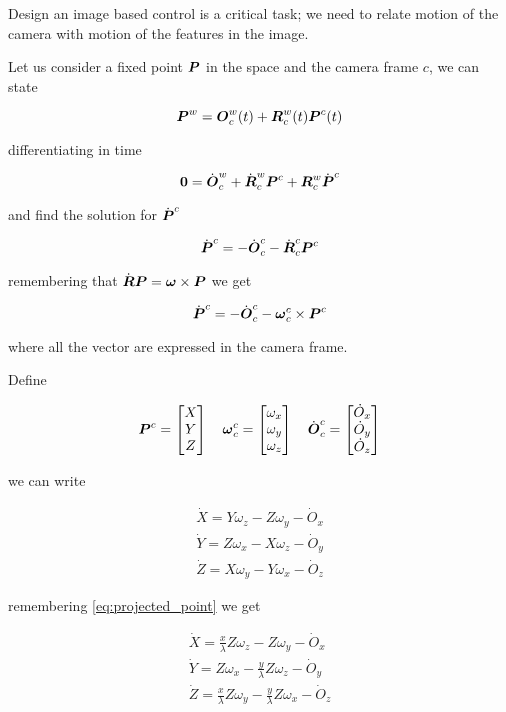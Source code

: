 Design an image based control is a critical task;
we need to relate motion of the camera with motion of the features in the image.

Let us consider a fixed point $\boldsymbol{P}$ in the space and the camera frame $c$, we can state

\[ \boldsymbol{P}^w = \boldsymbol{O}_c^w(t) + \boldsymbol{R}_c^w(t) \boldsymbol{P}^c(t) \]

differentiating in time

\[ \boldsymbol{0} = \dot{\boldsymbol{O}}_c^w + \dot{\boldsymbol{R}}_c^w \boldsymbol{P}^c + \boldsymbol{R}_c^w \dot{\boldsymbol{P}}^c \]

and find the solution for $\dot{\boldsymbol{P}}^c$

\[ \dot{\boldsymbol{P}}^c = - \dot{\boldsymbol{O}}_c^c - \dot{\boldsymbol{R}}_c^c \boldsymbol{P}^c \]

remembering that $\dot{\boldsymbol{R}} \boldsymbol{P} = \boldsymbol{\omega} \times \boldsymbol{P}$ we get

\[ \dot{\boldsymbol{P}}^c = - \dot{\boldsymbol{O}}_c^c - \boldsymbol{\omega}_c^c \times \boldsymbol{P}^c \]

where all the vector are expressed in the camera frame.

Define

\[
	\boldsymbol{P}^c = \begin{bmatrix} X \\ Y \\ Z \end{bmatrix} \quad
	\boldsymbol{\omega}_c^c = \begin{bmatrix} \omega_x \\ \omega_y \\ \omega_z \end{bmatrix} \quad
	\dot{\boldsymbol{O}}_c^c = \begin{bmatrix} \dot{O}_x \\ \dot{O}_y \\ \dot{O}_z \end{bmatrix}
\]

we can write

\begin{gather*}
	\dot{X} = Y\omega_z - Z\omega_y - \dot{O}_x \\
	\dot{Y} = Z\omega_x - X\omega_z - \dot{O}_y \\
	\dot{Z} = X\omega_y - Y\omega_x - \dot{O}_z
\end{gather*}

remembering \autoref{eq:projected_point} we get

\begin{gather*}
	\dot{X} = \frac{x}{\lambda} Z\omega_z - Z\omega_y - \dot{O}_x \\
	\dot{Y} = Z\omega_x - \frac{y}{\lambda} Z\omega_z - \dot{O}_y \\
	\dot{Z} = \frac{x}{\lambda} Z\omega_y - \frac{y}{\lambda} Z\omega_x - \dot{O}_z
\end{gather*}

